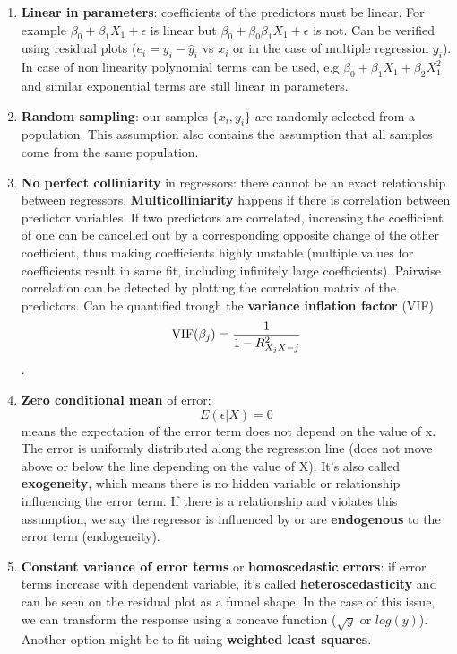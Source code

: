 \begin{enumerate}
    \item \textbf{Linear in parameters}: coefficients of the predictors must be linear. For example \(\beta_0 + \beta_1X_1 + \epsilon\) is linear but \(\beta_0 + \beta_0\beta_1X_1 + \epsilon\) is not. Can be verified using residual plots (\(e_i = y_i - \hat y_i\) vs \(x_i\) or in the case of multiple regression \(y_i\)). In case of non linearity polynomial terms can be used, e.g \(\beta_0 + \beta_1X_1 + \beta_2X_1^2\) and similar exponential terms are still linear in parameters.

    \item \textbf{Random sampling}: our samples \(\{x_i, y_i\}\) are randomly selected from a population. This assumption also contains the assumption that all samples come from the same population.

    \item \textbf{No perfect colliniarity} in regressors: there cannot be an exact relationship between regressors. \textbf{Multicolliniarity} happens if there is correlation between predictor variables. If two predictors are correlated, increasing the coefficient of one can be cancelled out by a corresponding opposite change of the other coefficient, thus making coefficients highly unstable (multiple values for coefficients result in same fit, including infinitely large coefficients). Pairwise correlation can be detected by plotting the correlation matrix of the predictors. Can be quantified trough the \textbf{variance inflation factor} (VIF) \[\operatorname{VIF}(\beta_j) = {1 \over 1 - R_{X_jX-j}^2}\].

    \item \textbf{Zero conditional mean} of error: \[E(\epsilon | X) = 0\] means the expectation of the error term does not depend on the value of x. The error is uniformly distributed along the regression line (does not move above or below the line depending on the value of X). It's also called \textbf{exogeneity}, which means there is no hidden variable or relationship influencing the error term. If there is a relationship and violates this assumption, we say the regressor is influenced by or are \textbf{endogenous} to the error term (endogeneity).

    \item \textbf{Constant variance of error terms} or \textbf{homoscedastic errors}: if error terms increase with dependent variable, it's called \textbf{heteroscedasticity} and can be seen on the residual plot as a funnel shape. In the case of this issue, we can transform the response using a concave function (\(\sqrt{y}\) or \(log(y)\)). Another option might be to fit using \textbf{weighted least squares}.


\end{enumerate}
